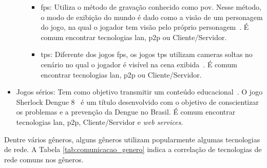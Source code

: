 \begin{itemize}
\begin{itemize}
        \begin{itemize}
          \item \ac{fps}: Utiliza o método de gravação conhecido como \ac{pov}. Nesse método, o modo de exibição do mundo é dado como a visão de um personagem do jogo, na qual o jogador tem visão pelo próprio personagem~\cite{video_game_technologies, adams_1208533}. É comum encontrar tecnologias \ac{lan}, \ac{p2p} ou Cliente/Servidor.
          \item \ac{tps}: Diferente dos jogos \ac{fps}, os jogos \ac{tps} utilizam cameras soltas no cenário no qual o jogador é visível na cena exibida~\cite{video_game_technologies, adams_1208533}. É comum encontrar tecnologias \ac{lan}, \ac{p2p} ou Cliente/Servidor.
        \end{itemize}
    \end{itemize}
  \item Jogos sérios: Tem como objetivo transmitir um conteúdo educacional~\cite{video_game_technologies}. O jogo Sherlock Dengue 8~\cite{sherlock_dengue} é um título desenvolvido com o objetivo de conscientizar os problemas e a prevenção da Dengue no Brasil. É comum encontrar tecnologias \ac{lan}, \ac{p2p}, Cliente/Servidor e \textit{web services}.
\end{itemize}



Dentre vários gêneros, alguns gêneros utilizam popularmente algumas tecnologias de rede.
%
A Tabela \ref{tab:comunicacao_genero} indica a correlação de tecnologias de rede comuns nos gêneros.

